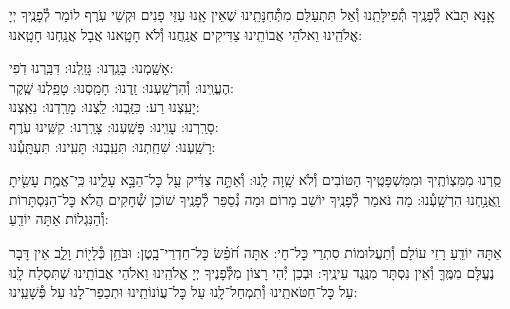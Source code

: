 \documentclass[twoside, openany, parskip=half, 11pt]{book}
\begin{document}
אׇׇנָּא תָּבֹא לְ֯פָנֶֽיךָ תְּ֯פִילָּתֵֽנוּ וְ֯אַל תִּתְעַלַּם מִתְּ֯חִנָּתֵֽינוּ שֶׁאֵין אָֽנוּ עַזֵּי פָנִים וּקְשֵׁי עֹֽרֶף לוֹמַר לְ֯פָנֶֽיךָ יְיָ אֱלֹהֵֽינוּ וֵאלֹהֵי אֲבוֹתֵֽינוּ צַדִּיקִים אֲנַֽחֲנוּ וְ֯לֹא חָטָֽאנוּ אֲבָל אֲנַֽחְנוּ חָטָֽאנוּ:

אָשַֽׁמְנוּ: בָּגַֽדְנוּ: גָּזַֽלְנוּ: דִּבַּֽרְנוּ דֹֽפִי: \\
הֶעֱוִֽינוּ: וְ֯הִרְשַֽׁעְנוּ: זַֽדְנוּ: חָמַֽסְנוּ: טָפַֽלְנוּ שֶֽׁקֶר:\\
יָעַֽצְנוּ רַע: כִּזַּֽבְנוּ: לַֽצְנוּ: מָרַֽדְנוּ: נִאַֽצְנוּ: \\
סָרַֽרְנוּ: עָוִֽינוּ: פָּשַֽׁעְנוּ: צָרַֽרְנוּ: קִשִּֽׁינוּ עֹֽרֶף:\\
רָשַֽׁעְנוּ: שִׁחַֽתְנוּ: תִּעַֽבְנוּ: תָּעִֽינוּ: תִּעְתָּֽעְ֯נוּ:

סַֽרְנוּ מִמִּצְוֹתֶֽיךָ וּמִמִּשְׁפָּטֶֽיךָ הַטּוֹבִים וְ֯לֹא שָֽׁוָה לָֽנוּ: וְ֯אַתָּ֣ה צַדִּ֔יק עַ֖ל כׇּל־הַבָּ֣א עָלֵ֑ינוּ כִּֽי־אֱמֶ֥ת עָשִׂ֖יתָ וַֽאֲנַ֥חְנוּ הִרְשָֽׁעְ֯נוּ: מַה נֹּאמַר לְ֯פָנֶֽיךָ יוֹשֵׁב מָרוֹם וּמַה נְ֯סַפֵּר לְ֯פָנֶֽיךָ שׁוֹכֵן שְׁ֯חָקִים הֲלֹא כׇּל־הַנִּסְתָּרוֹת וְ֯הַנִּגְלוֹת אַתָּה יוֹדֵֽעַ:

אַתָּה יוֹדֵֽעַ רָזֵי עוֹלָם וְ֯תַעֲלוּמוֹת סִתְרֵי כׇּל־חָי: אַתָּה חֹ֝פֵ֗שׂ כׇּל־חַדְרֵי־בָֽטֶן: וּבֹּחֵ֥ן כְּ֯לָי֖וֹת וָלֵ֑ב אֵין דָּבָר נֶעֱלָּם מִמֶּֽךָּ וְ֯אֵין נִסְתָּר מִנֶּֽגֶד עֵינֶֽיךָ: וּבְכֵן יְ֯הִי רָצוֹן מִלְּ֯פָנֶיךָ יְיָ אֱלֹהֵֽינוּ וֵאלֹהֵי אֲבוֹתֵֽינוּ שֶׁתִּסְלַח לָֽנוּ עַל כׇּל־חַטֹּאתֵֽינוּ וְ֯תִמְחַל־לָֽנוּ עַל כׇּל־עֲוֹנוֹתֵֽינוּ וּתְכַפֵר־לָנוּ עַל פְּ֯שָׁעֵֽינוּ:
\end{document}
